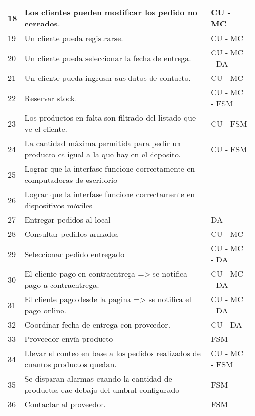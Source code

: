 \begin{center}
\begin{table}[H]
\begin{tabular}{|l|l|l|}
18  & Los clientes pueden modificar los pedido no cerrados. & CU - MC  \\ \hline
19 & Un cliente pueda registrarse. & CU - MC  \\ \hline
20  & Un cliente pueda seleccionar la fecha de entrega. & CU - MC - DA  \\ \hline
21  & Un cliente pueda ingresar sus datos de contacto. & CU - MC  \\ \hline
22  & Reservar stock. & CU - MC - FSM \\ \hline
23  & Los productos en falta son filtrado del listado que ve el cliente. & CU  - FSM \\ \hline
24  & {\scriptsize La cantidad máxima permitida para pedir un producto es igual a la que hay en el deposito}. & CU  - FSM \\ \hline
25  &  {\scriptsize Lograr que la interfase funcione correctamente en computadoras de escritorio} &  \\ \hline
26  & Lograr que la interfase funcione correctamente en dispositivos móviles &  \\ \hline
27  & Entregar pedidos al local & DA \\ \hline
28  & Consultar pedidos armados & CU - MC  \\ \hline
29  & Seleccionar pedido entregado & CU - MC - DA  \\ \hline
30  & El cliente pago en contraentrega => se notifica pago a contraentrega. & CU - MC - DA  \\ \hline
31  & El cliente pago desde la pagina => se notifica el pago online. & CU - MC - DA \\ \hline
32  & Coordinar fecha de entrega con proveedor. & CU - DA  \\ \hline
33  & Proveedor envía producto & FSM \\ \hline
34  &  {\scriptsize Llevar el conteo en base a los pedidos realizados de cuantos productos quedan.} & CU - MC  - FSM \\ \hline
35  &  {\scriptsize Se disparan alarmas cuando la cantidad de productos cae debajo del umbral configurado}  & FSM \\ \hline
36 & Contactar al proveedor. & FSM \\ \hline
\end{tabular}
\end{table}
\end{center}


